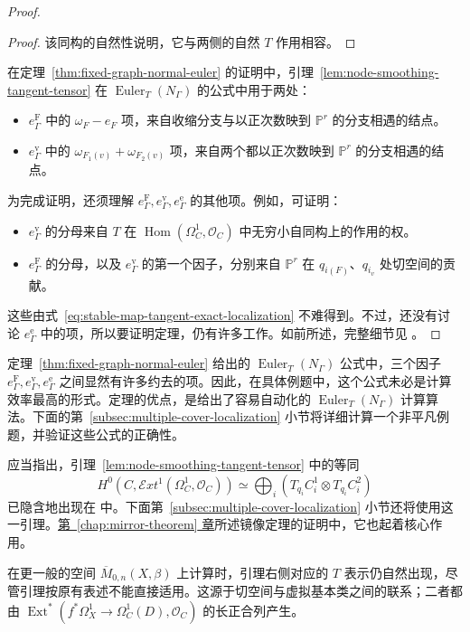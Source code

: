 \begin{proof}
\begin{proof}
该同构的自然性说明，它与两侧的自然 $T$ 作用相容。
\end{proof}
在定理~\ref{thm:fixed-graph-normal-euler} 的证明中，引理~\ref{lem:node-smoothing-tangent-tensor} 在 $\operatorname{Euler}_T(N_\Gamma)$ 的公式中用于两处：
\begin{itemize}
\item $e_\Gamma^{\mathrm F}$ 中的 $\omega_F-e_F$ 项，来自收缩分支与以正次数映到 $\mathbb P^r$ 的分支相遇的结点。
\item $e_\Gamma^{\mathrm v}$ 中的 $\omega_{F_1(v)}+\omega_{F_2(v)}$ 项，来自两个都以正次数映到 $\mathbb P^r$ 的分支相遇的结点。
\end{itemize}
为完成证明，还须理解 $e_\Gamma^{\mathrm F},e_\Gamma^{\mathrm v},e_\Gamma^{\mathrm e}$ 的其他项。例如，可证明：
\begin{itemize}
\item $e_\Gamma^{\mathrm v}$ 的分母来自 $T$ 在 $\operatorname{Hom}(\Omega_C^1,\mathcal O_C)$ 中无穷小自同构上的作用的权。
\item $e_\Gamma^{\mathrm F}$ 的分母，以及 $e_\Gamma^{\mathrm v}$ 的第一个因子，分别来自 $\mathbb P^r$ 在 $q_{i(F)}$、$q_{i_v}$ 处切空间的贡献。
\end{itemize}
这些由式~\eqref{eq:stable-map-tangent-exact-localization} 不难得到。不过，还没有讨论 $e_\Gamma^{\mathrm e}$ 中的项，所以要证明定理，仍有许多工作。如前所述，完整细节见 。
\end{proof}

定理~\ref{thm:fixed-graph-normal-euler} 给出的 $\operatorname{Euler}_T(N_\Gamma)$ 公式中，三个因子 $e_\Gamma^{\mathrm F},e_\Gamma^{\mathrm v},e_\Gamma^{\mathrm e}$ 之间显然有许多约去的项。因此，在具体例题中，这个公式未必是计算效率最高的形式。定理的优点，是给出了容易自动化的 $\operatorname{Euler}_T(N_\Gamma)$ 计算算法。下面的第~\ref{subsec:multiple-cover-localization} 小节将详细计算一个非平凡例题，并验证这些公式的正确性。

应当指出，引理~\ref{lem:node-smoothing-tangent-tensor} 中的等同
\[
H^0(C,\mathcal E xt^1(\Omega_C^1,\mathcal O_C))
\simeq\bigoplus_i(T_{q_i}C_i^1\otimes T_{q_i}C_i^2)
\]
已隐含地出现在  中。下面第~\ref{subsec:multiple-cover-localization} 小节还将使用这一引理。\hyperref[chap:mirror-theorem]{第~\ref*{chap:mirror-theorem} 章}所述镜像定理的证明中，它也起着核心作用。

在更一般的空间 $\overline M_{0,n}(X,\beta)$ 上计算时，引理右侧对应的 $T$ 表示仍自然出现，尽管引理按原有表述不能直接适用。这源于切空间与虚拟基本类之间的联系；二者都由 $\operatorname{Ext}^*(f^*\Omega_X^1\to\Omega_C^1(D),\mathcal O_C)$ 的长正合列产生。

